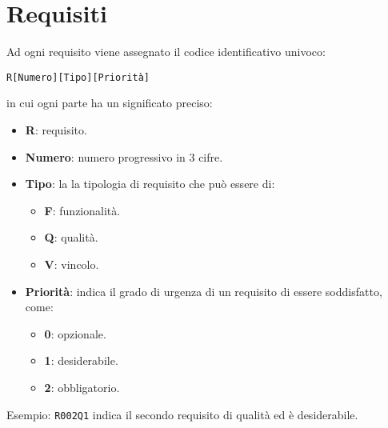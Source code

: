 \section{Requisiti}
Ad ogni requisito viene assegnato il codice identificativo univoco:
	\begin{center}
		\texttt{R[Numero][Tipo][Priorità]} 
	\end{center} 
	in cui ogni parte ha un significato preciso:
	\begin{itemize}
		\item \textbf{R}: requisito.
		\item \textbf{Numero}: numero progressivo in 3 cifre.
		\item \textbf{Tipo}: la la tipologia di requisito che può essere di:
		\begin{itemize}
			\item \textbf{F}: funzionalità.
			\item \textbf{Q}: qualità.
			\item \textbf{V}: vincolo.
		\end{itemize}
		\item \textbf{Priorità}: indica il grado di urgenza di un requisito di essere soddisfatto, come:
		\begin{itemize}
			\item \textbf{0}: opzionale.
			\item \textbf{1}: desiderabile.
			\item \textbf{2}: obbligatorio.
		\end{itemize}
	\end{itemize}
	
	Esempio: \texttt{R002Q1} indica il secondo requisito di qualità ed è desiderabile.
	

